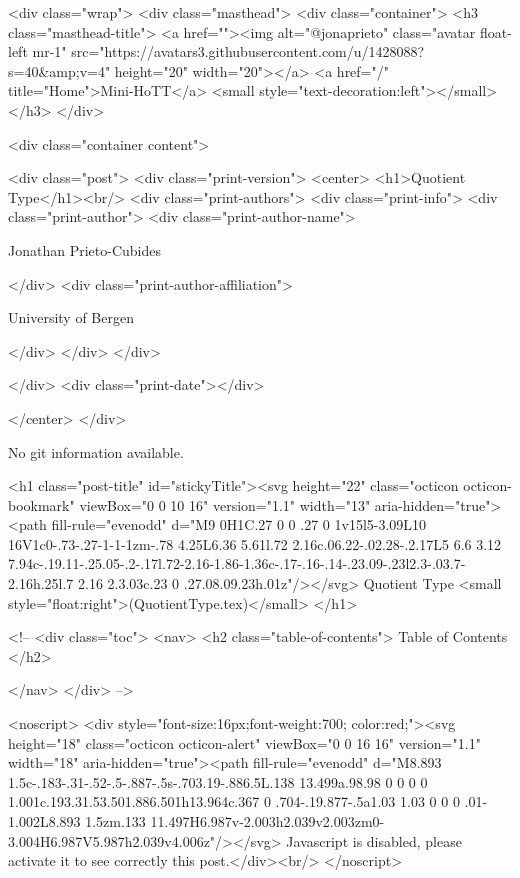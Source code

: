     <div class="wrap">
      <div class="masthead">
        <div class="container">
          <h3 class="masthead-title">
            <a href=""><img alt="@jonaprieto" class="avatar float-left mr-1" src="https://avatars3.githubusercontent.com/u/1428088?s=40&amp;v=4" height="20" width="20"></a>
            <a href="/" title="Home">Mini-HoTT</a>
            <small style="text-decoration:left"></small>
          </h3>
        </div>
      
      <div class="container content">
        







<div class="post">
  <div class="print-version">
    <center>
      <h1>Quotient Type</h1><br/>
        <div class="print-authors">
          <div class="print-info">
            <div class="print-author">
              <div class="print-author-name">
                
                  Jonathan Prieto-Cubides
                
              </div>
              <div class="print-author-affiliation">
                
                  University of Bergen
                
                </div>
            </div>
          </div>
          
          
        </div>
        <div class="print-date"></div>
        
        
    </center>
  </div>

  
  No git information available.
  

  <h1 class="post-title" id="stickyTitle"><svg height="22" class="octicon octicon-bookmark" viewBox="0 0 10 16" version="1.1" width="13" aria-hidden="true"><path fill-rule="evenodd" d="M9 0H1C.27 0 0 .27 0 1v15l5-3.09L10 16V1c0-.73-.27-1-1-1zm-.78 4.25L6.36 5.61l.72 2.16c.06.22-.02.28-.2.17L5 6.6 3.12 7.94c-.19.11-.25.05-.2-.17l.72-2.16-1.86-1.36c-.17-.16-.14-.23.09-.23l2.3-.03.7-2.16h.25l.7 2.16 2.3.03c.23 0 .27.08.09.23h.01z"/></svg> Quotient Type <small style="float:right">(QuotientType.tex)</small>
  </h1>

  <!-- 
  <div class="toc">
    <nav>
    <h2 class="table-of-contents"> Table of Contents </h2>
      

    </nav>
  </div>
   -->

  <noscript>
  <div style="font-size:16px;font-weight:700; color:red;"><svg height="18" class="octicon octicon-alert" viewBox="0 0 16 16" version="1.1" width="18" aria-hidden="true"><path fill-rule="evenodd" d="M8.893 1.5c-.183-.31-.52-.5-.887-.5s-.703.19-.886.5L.138 13.499a.98.98 0 0 0 0 1.001c.193.31.53.501.886.501h13.964c.367 0 .704-.19.877-.5a1.03 1.03 0 0 0 .01-1.002L8.893 1.5zm.133 11.497H6.987v-2.003h2.039v2.003zm0-3.004H6.987V5.987h2.039v4.006z"/></svg> Javascript is disabled, please activate it to see correctly this post.</div><br/>
  </noscript>

